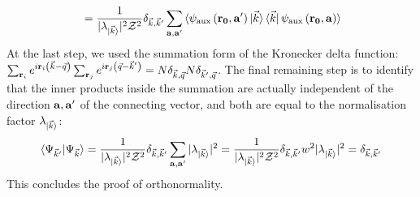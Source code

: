 \documentclass[reprint,hidelinks]{revtex4-2}
\begin{document}
\begin{widetext}
\begin{equation}
\begin{aligned}
						      &= \frac{1}{|\lambda_{\ket{\vec k}}|^2 \mathcal{Z}^2} \delta_{\vec k, \vec k^\prime}\sum_{{\bf a}, {\bf a}^\prime}\braket{\psi_\text{aux}\left( {\bf r_0}, {\bf a}^\prime \right) \ket{\vec k}\bra{\vec k} \psi_\text{aux}\left( {\bf r_0}, {\bf a} \right)}\\
\end{aligned}\end{equation}
At the last step, we used the summation form of the Kronecker delta function: \(\sum_{{\bf r}_i}e^{i {\bf r}_i \left( \vec k - \vec q \right) }\sum_{{\bf r}_j}e^{i {\bf r}_j \left( \vec q - \vec k^\prime \right) } = N \delta_{\vec k,\vec q}N \delta_{\vec k^\prime,\vec q}\). The final remaining step is to identify that the inner products inside the summation are actually independent of the direction \({\bf a}, {\bf a}^\prime\) of the connecting vector, and both are equal to the normalisation factor \(\lambda_{\ket{\vec k}}\):
\begin{equation}\begin{aligned}
	\braket{\Psi_{\vec k^\prime} | \Psi_{\vec k}} = \frac{1}{|\lambda_{\ket{\vec k}}|^2 \mathcal{Z}^2 } \delta_{\vec k, \vec k^\prime}\sum_{{\bf a},{\bf a}^\prime} |\lambda_{\ket{\vec k}}|^2 = \frac{1}{|\lambda_{\ket{\vec k}}|^2 \mathcal{Z}^2 } \delta_{\vec k, \vec k^\prime}w^2 |\lambda_{\ket{\vec k}}|^2 = \delta_{\vec k, \vec k^\prime}
\end{aligned}\end{equation}
This concludes the proof of orthonormality.


\end{widetext}
\end{document}
